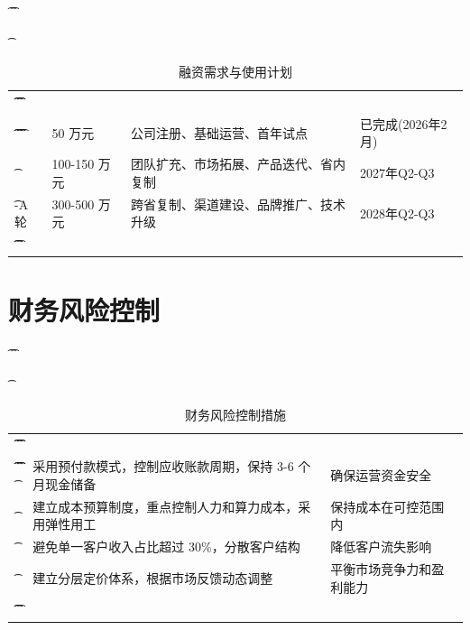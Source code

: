 \begin{table}[htbp]
	\t\centering
	\t\caption{融资需求与使用计划}
	\t\begin{tabularx}{\textwidth}{|L{3cm}C{2cm}YL{3.5cm}|}
		\t\t\toprule
		\t\t{} &  &       &  \\
		\t\t\midrule
		\t\t{}
		\t{}           & 50 万元        & 公司注册、基础运营、首年试点      & 已完成(2026年2月)   \\
		\t{}            & 100-150 万元   & 团队扩充、市场拓展、产品迭代、省内复制 & 2027年Q2-Q3     \\
		\t\tPre-A轮         & 300-500 万元   & 跨省复制、渠道建设、品牌推广、技术升级 & 2028年Q2-Q3     \\
		\t\t\bottomrule
		\t\end{tabularx}
\end{table}

\section{财务风险控制}

\begin{table}[htbp]
	\t\centering
	\t\caption{财务风险控制措施}
	\t\begin{tabularx}{\textwidth}{|L{3cm}YL{4cm}|}
		\t\t\toprule
		\t\t{} &                  &  \\
		\t\t\midrule
		\t\t{}
		\t{}          & 采用预付款模式，控制应收账款周期，保持 3-6 个月现金储备 & 确保运营资金安全       \\
		\t{}         & 建立成本预算制度，重点控制人力和算力成本，采用弹性用工    & 保持成本在可控范围内     \\
		\t{}        & 避免单一客户收入占比超过 30\%，分散客户结构       & 降低客户流失影响       \\
		\t{}           & 建立分层定价体系，根据市场反馈动态调整            & 平衡市场竞争力和盈利能力   \\
		\t\t\bottomrule
		\t\end{tabularx}
\end{table}
